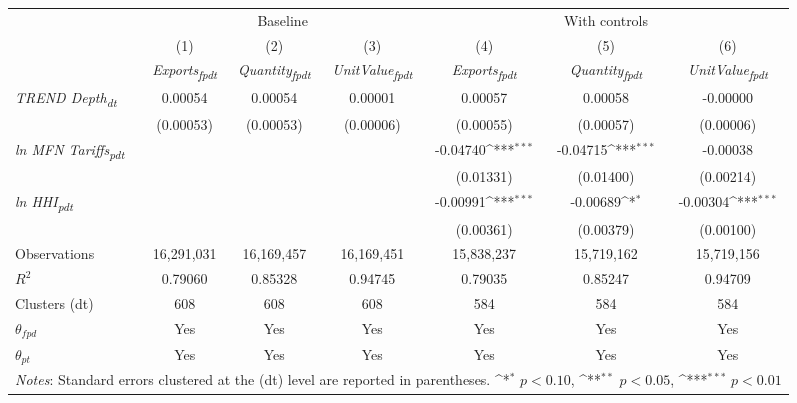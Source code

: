 {
\def\sym#1{\ifmmode^{#1}\else\(^{#1}\)\fi}
\begin{tabular}{l*{6}{c}}
\toprule
&\multicolumn{3}{c}{Baseline}&\multicolumn{3}{c}{With controls}\\\cmidrule(lr){2-4}\cmidrule(lr){5-7}
&(1)&(2)&(3)&(4)&(5)&(6)\\
&\textit{Exports\textsubscript{fpdt}}&\textit{Quantity\textsubscript{fpdt}}&\textit{UnitValue\textsubscript{fpdt}}&\textit{Exports\textsubscript{fpdt}}&\textit{Quantity\textsubscript{fpdt}}&\textit{UnitValue\textsubscript{fpdt}}\\
\midrule
\textit{TREND Depth\textsubscript{dt}} & 0.00054 & 0.00054 & 0.00001 & 0.00057 & 0.00058 & -0.00000\\
 & (0.00053) & (0.00053) & (0.00006) & (0.00055) & (0.00057) & (0.00006)\\
\addlinespace
\textit{ln MFN Tariffs\textsubscript{pdt}} &  &  &  & -0.04740\sym{***} & -0.04715\sym{***} & -0.00038\\
 &  &  &  & (0.01331) & (0.01400) & (0.00214)\\
\addlinespace
\textit{ln HHI\textsubscript{pdt}} &  &  &  & -0.00991\sym{***} & -0.00689\sym{*} & -0.00304\sym{***}\\
 &  &  &  & (0.00361) & (0.00379) & (0.00100)\\
\midrule
Observations & 16,291,031 & 16,169,457 & 16,169,451 & 15,838,237 & 15,719,162 & 15,719,156\\
$R^{2}$ & 0.79060 & 0.85328 & 0.94745 & 0.79035 & 0.85247 & 0.94709\\
Clusters (dt) & 608 & 608 & 608 & 584 & 584 & 584\\
$\theta_{fpd}$ & Yes & Yes & Yes & Yes & Yes & Yes\\
$\theta_{pt}$ & Yes & Yes & Yes & Yes & Yes & Yes\\
\bottomrule
\multicolumn{7}{l}{\footnotesize \textit{Notes}: Standard errors clustered at the (dt) level are reported in parentheses. \sym{*} \(p<0.10\), \sym{**} \(p<0.05\), \sym{***} \(p<0.01\)}\\
\end{tabular}
}
